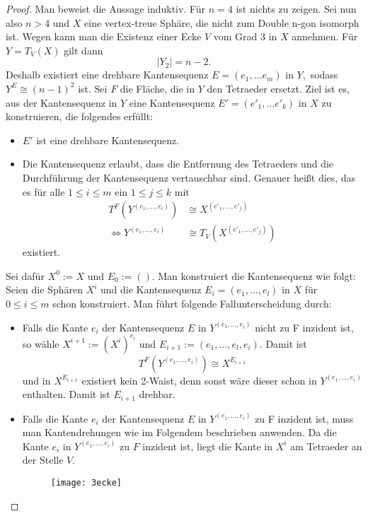 \documentclass[12pt,titlepage,twoside,cleardoublepage]{article}
\theoremstyle{nummermitklammern}
\numberwithin{equation}{section}
\begin{document}
\begin{proof}
Man beweist die Aussage induktiv. Für $n=4$ ist nichts zu zeigen. Sei nun also $n>4$ und $X$ eine vertex-treue Sphäre, die nicht zum Double n-gon isomorph ist. 
Wegen  kann man die Existenz einer Ecke $V$ vom Grad 3 in $X$ annehmen. Für $Y=T_V(X)$ gilt dann 
\[
\vert Y_2\vert=n-2.
\]
Deshalb existiert eine drehbare Kantensequenz $E=(e_1,\ldots e_m)$ in $Y,$ sodass $Y^E\cong (n-1)^2$ ist. Sei $F$ die Fläche, die in $Y$ den Tetraeder ersetzt. Ziel ist es, aus der Kantensequenz in $Y$ eine Kantensequenz $E'=(e'_1,\ldots e'_k)$ in $X$ zu konstruieren, die folgendes erfüllt:
\begin{itemize}
\item $E'$ ist eine drehbare Kantensequenz.
\item Die Kantensequenz erlaubt, dass die Entfernung des Tetraeders und die Durchführung der Kantensequenz vertauschbar sind. Genauer heißt dies, das es für alle $1\leq i\leq m$ ein $1\leq j \leq k$ mit 
\begin{align*}
T^F(Y^{(e_1,\ldots, e_i)})&\cong X^{(e'_1,\ldots,e'_j)} \\
\Leftrightarrow Y^{(e_1,\ldots, e_i)}&\cong T_V(X^{(e'_1,\ldots,e'_j)})
\end{align*} 
existiert.
\end{itemize}
Sei dafür $X^0:=X$ und $E_0:=().$ Man konstruiert die Kantensequenz wie folgt: Seien die Sphären $X^i$ und die Kantensequenz $E_i=(e_1,\ldots,e_l)$ in $X$ für $0\leq i \leq m$ schon konstruiert. Man führt folgende Fallunterscheidung durch:
\begin{itemize}
\item Falls die Kante $e_i$ der Kantensequenz $E$ in $Y^{(e_1,\ldots,e_i)}$ nicht zu F inzident ist, so wähle $X^{i+1}:={(X^i)}^{e_i}$ und $E_{i+1}:=(e_1,\ldots,e_l,e_i)$. Damit ist 
\[
T^F(Y^{(e_1,\ldots,e_i)})\cong X^{E_{i+1}}
\]
und in $X^{E_{i+1}}$ existiert kein 2-Waist, denn sonst wäre dieser schon in $Y^{(e_1,\ldots,e_i)}$ enthalten. Damit ist $E_{i+1}$ drehbar.
\item Falls die Kante $e_i$ der Kantensequenz $E$ in $Y^{(e_1,\ldots,e_i)}$ zu F inzident ist, muss man Kantendrehungen wie im Folgendem beschrieben anwenden. Da die Kante $e_i$ in $Y^{(e_1,\ldots,e_i)}$ zu $F$ inzident ist, liegt die Kante in $X^{i}$ am Tetraeder an der Stelle $V.$ 
\begin{figure}[H]
\begin{center}
\texttt{[image: 3ecke]}
\end{center}

\end{figure}
\end{itemize}
\end{proof}
\end{document}
